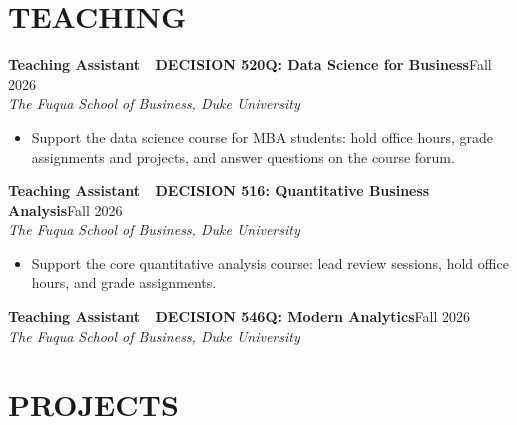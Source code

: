 \documentclass[11pt,letterpaper]{article}
\newcommand{\entry}[4]{%
  \noindent\textbf{\color{ink}#1}\hfill{\color{soft}\small #3}\\[1pt]%
  \textit{\color{muted}#2}\hfill\textit{\color{soft}\small #4}%
  \vspace{2pt}%
}
\begin{document}
\section{TEACHING}

\entry{Teaching Assistant \,\textemdash\, DECISION 520Q: Data Science for Business}{The Fuqua School of Business, Duke University}{Fall 2026}{}
\begin{itemize}
  \item Support the data science course for MBA students: hold office hours, grade assignments and projects, and answer questions on the course forum.
\end{itemize}

\vspace{4pt}
\entry{Teaching Assistant \,\textemdash\, DECISION 516: Quantitative Business Analysis}{The Fuqua School of Business, Duke University}{Fall 2026}{}
\begin{itemize}
  \item Support the core quantitative analysis course: lead review sessions, hold office hours, and grade assignments.
\end{itemize}

\vspace{4pt}
\entry{Teaching Assistant \,\textemdash\, DECISION 546Q: Modern Analytics}{The Fuqua School of Business, Duke University}{Fall 2026}{}

\section{PROJECTS}
\end{document}

